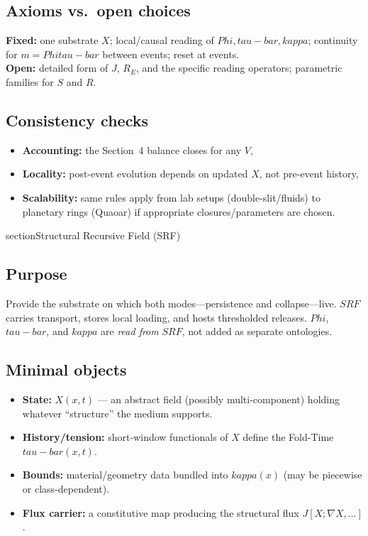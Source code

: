 \documentclass[12pt]{article}
\newcommand{\FoldDensity}{\Phi}
\newcommand{\FoldTime}{\bar{\tau}}
\newcommand{\Threshold}{\kappa}
\newcommand{\Survival}{S}
\newcommand{\Release}{R}
\newcommand{\SRF}{\mathcal{F}_{\mathrm{SR}}}
\def\FoldDensity{Phi}%
\def\FoldTime{tau-bar}%
\def\Threshold{kappa}%
\def\SRF{SRF}%
\def\Survival{S}%
\def\Release{R}%
\def\bar#1{#1}%
\def\mathcal#1{#1}%
\def\mathrm#1{#1}%
\begin{document}
\subsection{Axioms vs.\ open choices}
\textbf{Fixed:} one substrate $X$; local/causal reading of $\FoldDensity,\FoldTime,\Threshold$; continuity for $m=\FoldDensity\FoldTime$ between events; reset at events.\\
\textbf{Open:} detailed form of $J$, $\mathcal{R}_E$, and the specific reading operators; parametric families for $\Survival$ and $\Release$.

\subsection{Consistency checks}
\begin{itemize}
  \item \textbf{Accounting:} the Section~4 balance closes for any $V$,
  \item \textbf{Locality:} post-event evolution depends on updated $X$, not pre-event history,
  \item \textbf{Scalability:} same rules apply from lab setups (double-slit/fluids) to planetary rings (Quaoar) if appropriate closures/parameters are chosen.
\end{itemize}
section{Structural Recursive Field (SRF)}

\subsection{Purpose}
Provide the substrate on which both modes—persistence and collapse—live. $\SRF$ carries transport, stores local loading, and hosts thresholded releases. $\FoldDensity$, $\FoldTime$, and $\Threshold$ are \emph{read from} $\SRF$, not added as separate ontologies.

\subsection{Minimal objects}
\begin{itemize}
  \item \textbf{State:} $X(x,t)$ — an abstract field (possibly multi-component) holding whatever ``structure'' the medium supports.
  \item \textbf{History/tension:} short-window functionals of $X$ define the Fold-Time $\FoldTime(x,t)$.
  \item \textbf{Bounds:} material/geometry data bundled into $\Threshold(x)$ (may be piecewise or class-dependent).
  \item \textbf{Flux carrier:} a constitutive map producing the structural flux $J[X;\nabla X,\dots]$.
\end{itemize}
\end{document}
